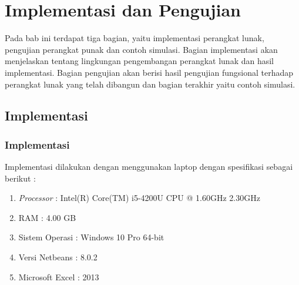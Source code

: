 \chapter{Implementasi dan Pengujian}
\label{chap:implementasi}

Pada bab ini terdapat tiga bagian, yaitu implementasi perangkat lunak, pengujian perangkat punak dan contoh simulasi. Bagian implementasi akan menjelaskan tentang lingkungan pengembangan perangkat lunak dan hasil implementasi. Bagian pengujian akan berisi hasil pengujian fungsional terhadap perangkat lunak yang telah dibangun dan bagian terakhir yaitu contoh simulasi.

\section{Implementasi}
\label{sec:implementasi}

\subsection{Implementasi}
Implementasi dilakukan dengan menggunakan laptop dengan spesifikasi sebagai berikut :
\begin{enumerate}
	\item \textit{Processor} : Intel(R) Core(TM) i5-4200U CPU @ 1.60GHz 2.30GHz
	\item RAM : 4.00 GB
	\item Sistem Operasi : Windows 10 Pro 64-bit
	\item Versi Netbeans : 8.0.2
	\item Microsoft Excel : 2013
\end{enumerate}

